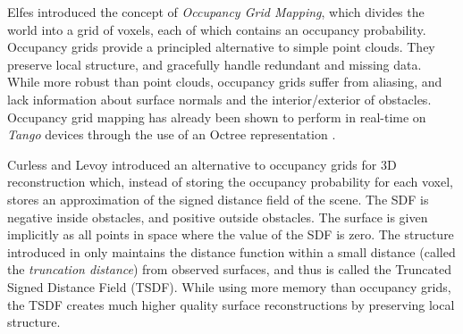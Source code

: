 \documentclass[conference]{IEEEtran}
\begin{document}
Elfes \cite{Elfes1989} introduced the concept of \emph{Occupancy Grid
Mapping}, which divides the world into a grid of voxels, each of which contains
an occupancy probability. Occupancy grids provide a principled alternative to
simple point clouds. They preserve local structure, and gracefully handle
redundant and missing data.  While more robust than point clouds, occupancy
grids suffer from aliasing, and lack information about surface normals and the
interior/exterior of obstacles. Occupancy grid mapping has already been shown to
perform in real-time on \textit{Tango}\cite{Tango} devices through the use of an
Octree representation \cite{Wurm2010}.


Curless and Levoy \cite{Curless1996} introduced an alternative to occupancy
grids for 3D reconstruction which, instead of storing the occupancy probability for each
voxel, stores an approximation of the signed distance field of the scene.  The
SDF is negative inside obstacles, and positive outside obstacles. The surface
is given implicitly as all points in space where the value of the SDF is zero.
The structure introduced in \cite{Curless1996} only maintains the distance
function within a small distance (called the \emph{truncation distance}) from
observed surfaces, and thus is called the Truncated Signed Distance Field
(TSDF).  While using more memory than occupancy grids, the TSDF creates much
higher quality surface reconstructions by preserving local structure.
\end{document}
